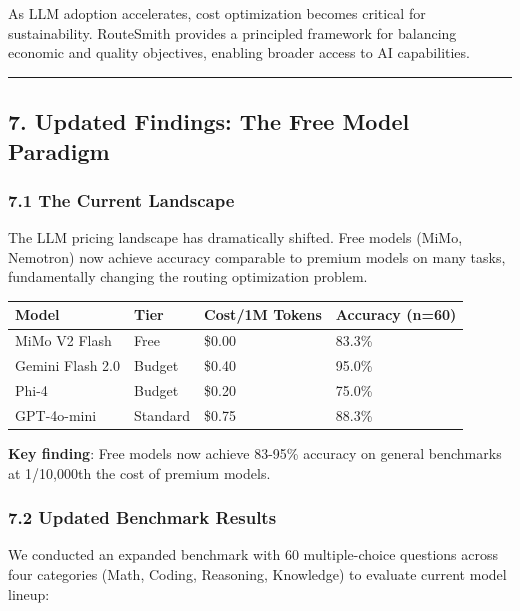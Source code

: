 \documentclass[
]{article}
\begin{document}
As LLM adoption accelerates, cost optimization becomes critical for
sustainability. RouteSmith provides a principled framework for balancing
economic and quality objectives, enabling broader access to AI
capabilities.

\begin{center}\rule{0.5\linewidth}{0.5pt}\end{center}

\hypertarget{updated-findings-the-free-model-paradigm}{%
\subsection{7. Updated Findings: The Free Model
Paradigm}\label{updated-findings-the-free-model-paradigm}}

\hypertarget{the-current-landscape}{%
\subsubsection{7.1 The Current Landscape}\label{the-current-landscape}}

The LLM pricing landscape has dramatically shifted. Free models (MiMo,
Nemotron) now achieve accuracy comparable to premium models on many
tasks, fundamentally changing the routing optimization problem.

\begin{longtable}[]{@{}llll@{}}
\toprule
Model & Tier & Cost/1M Tokens & Accuracy (n=60) \\
\midrule
\endhead
MiMo V2 Flash & Free & \$0.00 & 83.3\% \\
Gemini Flash 2.0 & Budget & \$0.40 & 95.0\% \\
Phi-4 & Budget & \$0.20 & 75.0\% \\
GPT-4o-mini & Standard & \$0.75 & 88.3\% \\
\bottomrule
\end{longtable}

\textbf{Key finding}: Free models now achieve 83-95\% accuracy on
general benchmarks at 1/10,000th the cost of premium models.

\hypertarget{updated-benchmark-results}{%
\subsubsection{7.2 Updated Benchmark
Results}\label{updated-benchmark-results}}

We conducted an expanded benchmark with 60 multiple-choice questions
across four categories (Math, Coding, Reasoning, Knowledge) to evaluate
current model lineup:
\end{document}
